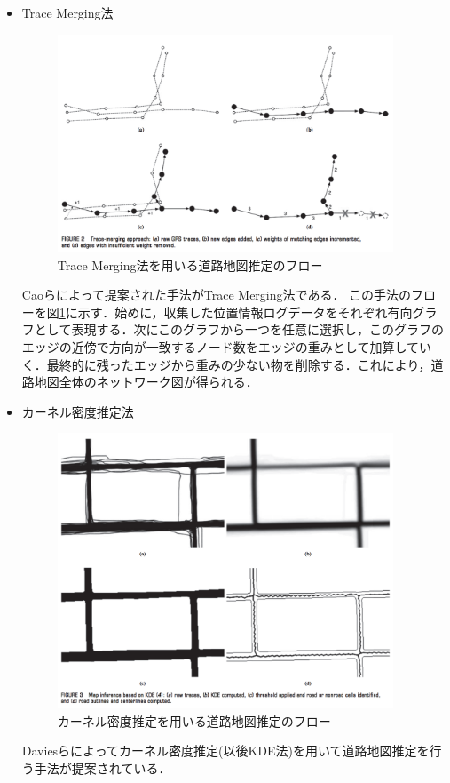 \begin{itemize}
	      	      	      	      	      
	\item Trace Merging法\\
	      \begin{figure}
	      	\centering
	      	\includegraphics[width=10cm]{fig/trace-merging-inf.png}
	      	\caption{Trace Merging法を用いる道路地図推定のフロー \protect \footnotemark}
	      	\label{trace-merging-inf}
          \end{figure}
	      Caoらによって提案された手法がTrace Merging法である\cite{Cao}． 
	      この手法のフローを図\ref{trace-merging-inf}に示す．始めに，収集した位置情報ログデータをそれぞれ有向グラフとして表現する．次にこのグラフから一つを任意に選択し，このグラフのエッジの近傍で方向が一致するノード数をエッジの重みとして加算していく．最終的に残ったエッジから重みの少ない物を削除する．これにより，道路地図全体のネットワーク図が得られる．
	      	      	      	      	      
	\item カーネル密度推定法\\
	      \begin{figure}
	      	\centering
	      	\includegraphics[width=10cm]{fig/kde-inf.png}
	      	\caption{カーネル密度推定を用いる道路地図推定のフロー \protect \footnotemark}
	      	\label{kde-inf}
          \end{figure}
	      Daviesらによってカーネル密度推定(以後KDE法)\cite{Ueki}を用いて道路地図推定を行う手法が提案されている\cite{Davies}．
	      	      	      	      	      

\end{itemize}
